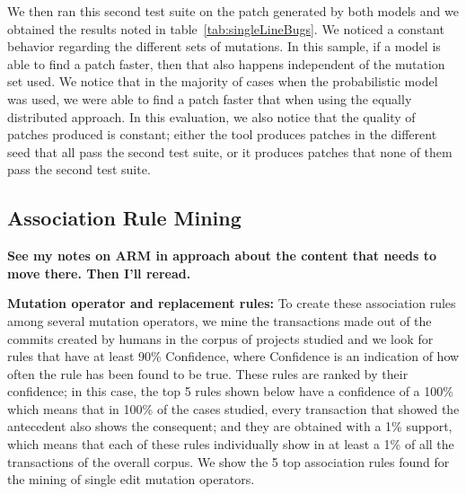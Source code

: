 \documentclass[conference]{IEEEtran}
\newcommand{\todo}[1]
  {{\scriptsize \textbf{\color{red} {#1}}}}
\begin{document}
We then ran this second test suite on the patch generated by both models and we
obtained the results noted in table~\ref{tab:singleLineBugs}. We noticed a
constant behavior regarding the different sets of mutations. In this sample, if
a model is able to find a patch faster, then that also happens independent of
the mutation set used. We notice that in the majority of cases when the
probabilistic model was used, we were able to find a patch faster that when
using the equally distributed approach. In this evaluation, we also notice that
the quality of patches produced is constant; either the tool produces patches in
the different seed that all pass the second test suite, or it produces patches
that none of them pass the second test suite.  


\subsection{Association Rule Mining} \label{armRes}
\todo{See my notes on ARM in approach about the content that needs to move
  there.  Then I'll reread.}

\textbf{Mutation operator and replacement rules:}
To create these association rules among several mutation operators, we mine the
transactions made out of the commits created by humans in the corpus of projects
studied and we look for rules that have at least 90\% Confidence, where
Confidence is an indication of how often the rule has been found to be true.  
These rules are ranked by their confidence; in this case, the top 5 rules shown
below have a confidence of a 100\% which means that in 100\% of the cases
studied, every transaction that showed the antecedent also shows the consequent;
and they are obtained with a 1\% support, which means that each of these rules
individually show in at least a 1\% of all the transactions of the overall
corpus. We show the 5  top association rules found for the mining of single edit
mutation operators. 
\end{document}
